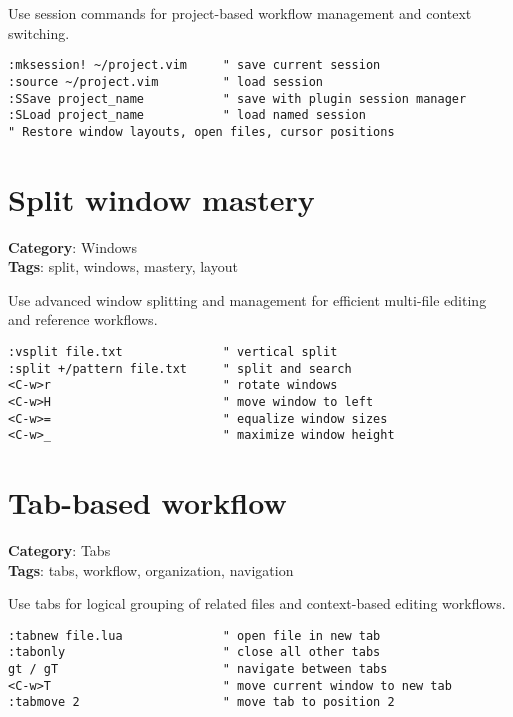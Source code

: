 {{{{Use session commands for project-based workflow management and context switching.

\begin{Exa*}{}
\begin{Verbatim}[fontsize=\footnotesize, breaklines, breakanywhere]
:mksession! ~/project.vim     " save current session
:source ~/project.vim         " load session
:SSave project_name           " save with plugin session manager
:SLoad project_name           " load named session
" Restore window layouts, open files, cursor positions
\end{Verbatim}
\end{Exa*}

\section{Split window mastery}

\textbf{Category}: Windows\\ \textbf{Tags}: split, windows, mastery, layout
\vspace{0.5cm}

Use advanced window splitting and management for efficient multi-file editing and reference workflows.

\begin{Exa*}{}
\begin{Verbatim}[fontsize=\footnotesize, breaklines, breakanywhere]
:vsplit file.txt              " vertical split
:split +/pattern file.txt     " split and search
<C-w>r                        " rotate windows
<C-w>H                        " move window to left
<C-w>=                        " equalize window sizes
<C-w>_                        " maximize window height
\end{Verbatim}
\end{Exa*}

\section{Tab-based workflow}

\textbf{Category}: Tabs\\ \textbf{Tags}: tabs, workflow, organization, navigation
\vspace{0.5cm}

Use tabs for logical grouping of related files and context-based editing workflows.

\begin{Exa*}{}
\begin{Verbatim}[fontsize=\footnotesize, breaklines, breakanywhere]
:tabnew file.lua              " open file in new tab
:tabonly                      " close all other tabs
gt / gT                       " navigate between tabs
<C-w>T                        " move current window to new tab
:tabmove 2                    " move tab to position 2
\end{Verbatim}
\end{Exa*}

}}}}
